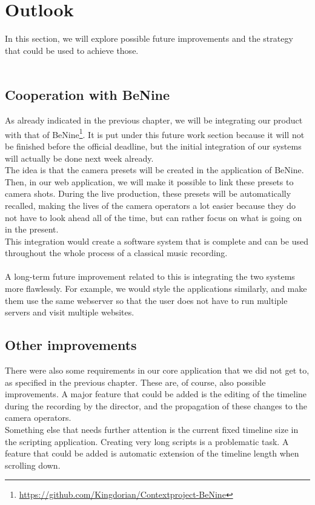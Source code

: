 \section{Outlook}

In this section, we will explore possible future improvements and the strategy that could be used to achieve those.\\\\

\subsection{Cooperation with BeNine}
As already indicated in the previous chapter, we will be integrating our product with that of BeNine\footnote{\url{https://github.com/Kingdorian/Contextproject-BeNine}}. It is put under this future work section because it will not be finished before the official deadline, but the initial integration of our systems will actually be done next week already.\\
The idea is that the camera presets will be created in the application of BeNine. Then, in our web application, we will make it possible to link these presets to camera shots. During the live production, these presets will be automatically recalled, making the lives of the camera operators a lot easier because they do not have to look ahead all of the time, but can rather focus on what is going on in the present.\\
This integration would create a software system that is complete and can be used throughout the whole process of a classical music recording.\\\\
A long-term future improvement related to this is integrating the two systems more flawlessly. For example, we would style the applications similarly, and make them use the same webserver so that the user does not have to run multiple servers and visit multiple websites.

\subsection{Other improvements}
There were also some requirements in our core application that we did not get to, as specified in the previous chapter. These are, of course, also possible improvements. A major feature that could be added is the editing of the timeline during the recording by the director, and the propagation of these changes to the camera operators.\\
Something else that needs further attention is the current fixed timeline size in the scripting application. Creating very long scripts is a problematic task. A feature that could be added is automatic extension of the timeline length when scrolling down.



